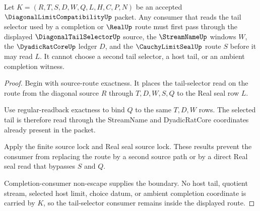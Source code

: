 \begin{theorem}
\label{thm:diagonal-limit-compatibility-tail-selector-consumer-boundary}
Let $K=(R,T,S,D,W,Q,L,H,C,P,N)$ be an accepted $\DiagonalLimitCompatibilityUp$ packet. Any consumer that reads the tail selector used by a completion or $\RealUp$ route must first pass through the displayed $\DiagonalTailSelectorUp$ source, the $\StreamNameUp$ windows $W$, the $\DyadicRatCoreUp$ ledger $D$, and the $\CauchyLimitSealUp$ route $S$ before it may read $L$. It cannot choose a second tail selector, a host tail, or an ambient completion witness.
\end{theorem}
\begin{proof}
Begin with source-route exactness. It places the tail-selector read on the route from the diagonal source $R$ through $T,D,W,S,Q$ to the Real seal row $L$.

Use regular-readback exactness to bind $Q$ to the same $T,D,W$ rows. The selected tail is therefore read through the StreamName and DyadicRatCore coordinates already present in the packet.

Apply the finite source lock and Real seal source lock. These results prevent the consumer from replacing the route by a second source path or by a direct Real seal read that bypasses $S$ and $Q$.

Completion-consumer non-escape supplies the boundary. No host tail, quotient stream, selected host limit, choice datum, or ambient completion coordinate is carried by $K$, so the tail-selector consumer remains inside the displayed route.
\end{proof}

